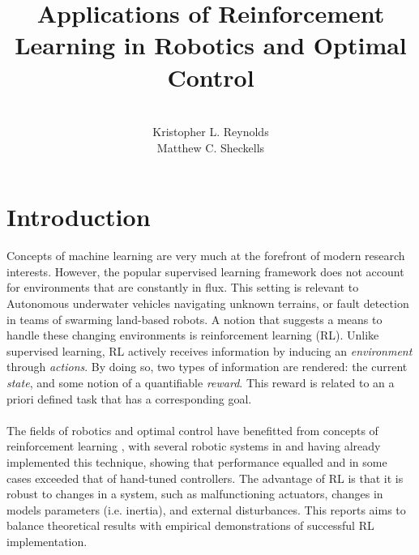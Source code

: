 \documentclass[10pt]{article}
\begin{document}
\title{Applications of Reinforcement Learning in Robotics and Optimal Control}%
\author{\\ %
Kristopher L. Reynolds\\
Matthew C. Sheckells
\\} %
\maketitle
\section{Introduction}
Concepts of machine learning are very much at the forefront of modern research interests. However, the popular supervised learning framework does not account for environments that are constantly in flux. This setting is relevant to Autonomous underwater vehicles navigating unknown terrains, or fault detection in teams of swarming land-based robots. A notion that suggests a means to handle these changing environments is reinforcement learning (RL). Unlike supervised learning, RL actively receives information by inducing an \textit{environment} through \textit{actions}. By doing so, two types of information are rendered: the current \textit{state}, and some notion of a quantifiable \textit{reward}. This reward is related to an a priori defined task that has a corresponding goal. 
\\
\\
The fields of robotics and optimal control have benefitted from concepts of reinforcement learning\cite{kober_reinforcement_2013} \cite{kaelbling_reinforcement_1996}, with several robotic systems in  \cite{bhasin_reinforcement_2011} and \cite{hester_rtmba:_2012} having already implemented this technique, showing that performance equalled and in some cases exceeded that of hand-tuned controllers. The advantage of RL is that it is robust to changes in a system, such as malfunctioning actuators, changes in models parameters (i.e. inertia), and external disturbances. This reports aims to balance theoretical results with empirical demonstrations of successful RL implementation. 
\end{document}

